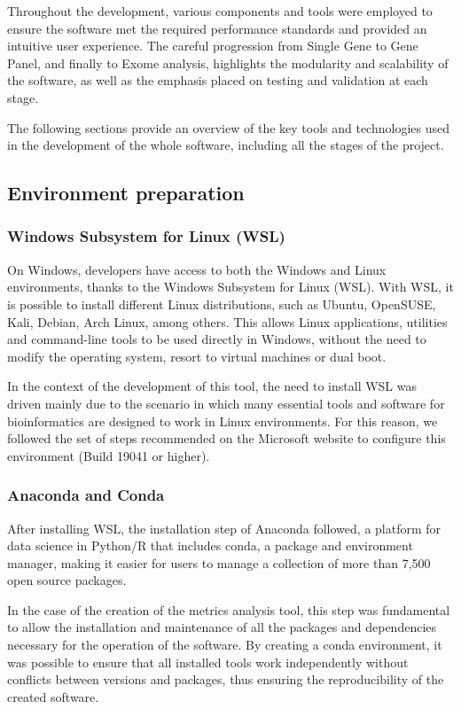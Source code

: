 Throughout the development, various components and tools were employed to ensure the software met the required performance standards and provided an intuitive user experience. The careful progression from Single Gene to Gene Panel, and finally to Exome analysis, highlights the modularity and scalability of the software, as well as the emphasis placed on testing and validation at each stage.

The following sections provide an overview of the key tools and technologies used in the development of the whole software, including all the stages of the project.
\subsection{Environment preparation }
\subsubsection{\textbf{Windows Subsystem for Linux (WSL)}}

On Windows, developers have access to both the Windows and Linux environments, thanks to the Windows Subsystem for Linux (WSL). With WSL, it is possible to install different Linux distributions, such as Ubuntu, OpenSUSE, Kali, Debian, Arch Linux, among others. This allows Linux applications, utilities and command-line tools to be used directly in Windows, without the need to modify the operating system, resort to virtual machines or dual boot. \cite{wsl}

In the context of the development of this tool, the need to install WSL was driven mainly due to the scenario in which many essential tools and software for bioinformatics are designed to work in Linux environments. For this reason, we followed the set of steps recommended on the Microsoft website to configure this environment (Build 19041 or higher). \cite{wsl}

\subsubsection{\textbf{Anaconda and Conda}}

After installing WSL, the installation step of Anaconda followed, a platform for data science in Python/R that includes conda, a package and environment manager, making it easier for users to manage a collection of more than 7,500 open source packages. \cite{anaconda1}

In the case of the creation of the metrics analysis tool, this step was fundamental to allow the installation and maintenance of all the packages and dependencies necessary for the operation of the software. By creating a conda environment, it was possible to ensure that all installed tools work independently without conflicts between versions and packages, thus ensuring the reproducibility of the created software. \cite{anaconda2}

